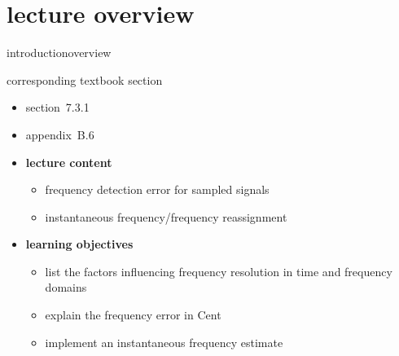 


\subtitle{module B.6: frequency resolution \& instantaneous frequency}


	

    \section[overview]{lecture overview}
        \begin{frame}{introduction}{overview}
            \begin{block}{corresponding textbook section}
                \begin{itemize}
                    \item section~7.3.1
                    \item appendix~B.6
                \end{itemize}
            \end{block}

            \begin{itemize}
                \item   \textbf{lecture content}
                    \begin{itemize}
                        \item   frequency detection error for sampled signals
                        \item   instantaneous frequency/frequency reassignment
                    \end{itemize}
                \bigskip
                \item<2->   \textbf{learning objectives}
                    \begin{itemize}
                        \item   list the factors influencing frequency resolution in time and frequency domains
                        \item   explain the frequency error in Cent
                        \item   implement an instantaneous frequency estimate
                    \end{itemize}
            \end{itemize}
        \end{frame}

